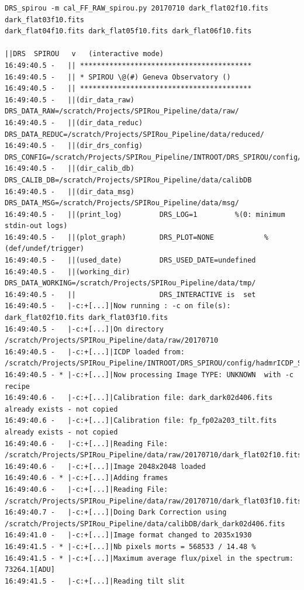 \begin{lstlisting}[style=text]
DRS_spirou -m cal_FF_RAW_spirou.py 20170710 dark_flat02f10.fits dark_flat03f10.fits
dark_flat04f10.fits dark_flat05f10.fits dark_flat06f10.fits

||DRS  SPIROU   v   (interactive mode)
16:49:40.5 -   || *****************************************
16:49:40.5 -   || * SPIROU \@(#) Geneva Observatory ()
16:49:40.5 -   || *****************************************
16:49:40.5 -   ||(dir_data_raw)      DRS_DATA_RAW=/scratch/Projects/SPIRou_Pipeline/data/raw/
16:49:40.5 -   ||(dir_data_reduc)    DRS_DATA_REDUC=/scratch/Projects/SPIRou_Pipeline/data/reduced/
16:49:40.5 -   ||(dir_drs_config)    DRS_CONFIG=/scratch/Projects/SPIRou_Pipeline/INTROOT/DRS_SPIROU/config/
16:49:40.5 -   ||(dir_calib_db)      DRS_CALIB_DB=/scratch/Projects/SPIRou_Pipeline/data/calibDB
16:49:40.5 -   ||(dir_data_msg)      DRS_DATA_MSG=/scratch/Projects/SPIRou_Pipeline/data/msg/
16:49:40.5 -   ||(print_log)         DRS_LOG=1         %(0: minimum stdin-out logs)
16:49:40.5 -   ||(plot_graph)        DRS_PLOT=NONE            %(def/undef/trigger)
16:49:40.5 -   ||(used_date)         DRS_USED_DATE=undefined
16:49:40.5 -   ||(working_dir)       DRS_DATA_WORKING=/scratch/Projects/SPIRou_Pipeline/data/tmp/
16:49:40.5 -   ||                    DRS_INTERACTIVE is  set
16:49:40.5 -   |-c:+[...]|Now running : -c on file(s):  dark_flat02f10.fits dark_flat03f10.fits
16:49:40.5 -   |-c:+[...]|On directory /scratch/Projects/SPIRou_Pipeline/data/raw/20170710
16:49:40.5 -   |-c:+[...]|ICDP loaded from: /scratch/Projects/SPIRou_Pipeline/INTROOT/DRS_SPIROU/config/hadmrICDP_SPIROU.py
16:49:40.5 - * |-c:+[...]|Now processing Image TYPE: UNKNOWN  with -c recipe
16:49:40.6 -   |-c:+[...]|Calibration file: dark_dark02d406.fits already exists - not copied
16:49:40.6 -   |-c:+[...]|Calibration file: fp_fp02a203_tilt.fits already exists - not copied
16:49:40.6 -   |-c:+[...]|Reading File: /scratch/Projects/SPIRou_Pipeline/data/raw/20170710/dark_flat02f10.fits
16:49:40.6 -   |-c:+[...]|Image 2048x2048 loaded
16:49:40.6 - * |-c:+[...]|Adding frames
16:49:40.6 -   |-c:+[...]|Reading File: /scratch/Projects/SPIRou_Pipeline/data/raw/20170710/dark_flat03f10.fits
16:49:40.7 -   |-c:+[...]|Doing Dark Correction using /scratch/Projects/SPIRou_Pipeline/data/calibDB/dark_dark02d406.fits
16:49:41.0 -   |-c:+[...]|Image format changed to 2035x1930
16:49:41.5 - * |-c:+[...]|Nb pixels morts = 568533 / 14.48 %
16:49:41.5 - * |-c:+[...]|Maximum average flux/pixel in the spectrum: 73264.1[ADU]
16:49:41.5 -   |-c:+[...]|Reading tilt slit 

\end{lstlisting}
